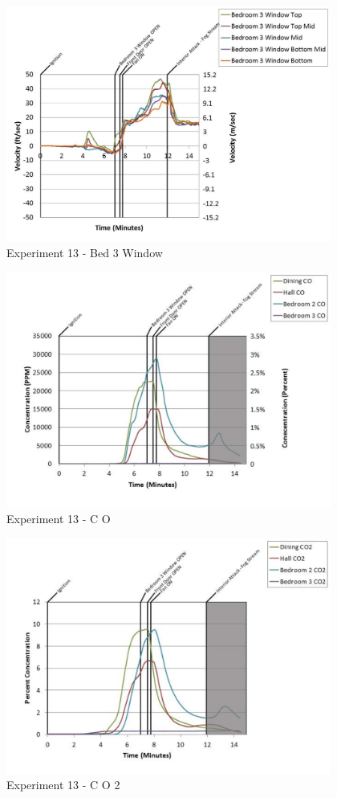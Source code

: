 \documentclass{article}
\begin{document}
\begin{appendices}
	\begin{figure}[h!]
		\centering
		\includegraphics[height=3.05in]{0_Images/Results_Charts/Exp_13_Charts/Bed3Window.pdf}
		\caption{Experiment 13 - Bed 3 Window}
	\end{figure}
 
	\clearpage

	\begin{figure}[h!]
		\centering
		\includegraphics[height=3.05in]{0_Images/Results_Charts/Exp_13_Charts/CO.pdf}
		\caption{Experiment 13 - C O}
	\end{figure}
 

	\begin{figure}[h!]
		\centering
		\includegraphics[height=3.05in]{0_Images/Results_Charts/Exp_13_Charts/CO2.pdf}
		\caption{Experiment 13 - C O 2}
	\end{figure}
 

\end{appendices}
\end{document}
